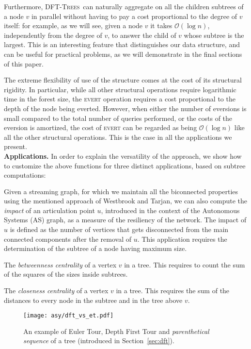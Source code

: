 \documentclass[a4paper,USenglish]{lipics}
\newcommand{\bigoh}{\mathcal{O}}
\newcommand{\dfts}{\textsc{DFT-Trees}}
\newcommand{\runinsec}[1]{\noindent\textbf{\textsf{#1}}\quad}
\begin{document}
Furthermore, \dfts\ can naturally aggregate on all the children subtrees of a node $v$ in parallel without having to pay a cost proportional to the degree of $v$ itself: for example, as we will see, given a node $v$ it takes $\bigoh(\log n)$, independently from the degree of $v$, to answer the child of $v$ whose subtree is the largest. This is an interesting feature that distinguishes our data structure, and can be useful for practical problems, as we will demonstrate in the final sections of this paper.

The extreme flexibility of use of the structure comes at the cost of its structural rigidity. In particular, while all other structural operations require logarithmic time in the forest size, the \textsc{evert} operation requires a cost proportional to the depth of the node being everted. However, when either the number of eversions is small compared to the total number of queries performed, or the costs of the eversion is amortized, the cost of \textsc{evert} can be regarded as being $\bigoh(\log n)$ like all the other structural operations. This is the case in all the applications we present.
\\[3mm]
\runinsec{Applications.}  In order to explain the versatility of the approach, we show how to customize the above functions for three distinct applications, based on subtree computations:
\begin{compactitem}
\item Given a streaming graph, for which we maintain all the biconnected properties using the mentioned approach of Westbrook and Tarjan, we can also compute the \emph{impact} of an articulation point $u$, introduced in the context of the Autonomous Systems (AS) graph, as a measure of the resiliency of the network. The impact of $u$ is defined as the number of vertices that gets disconnected from the main connected components after the removal of $u$. This application requires the determination of the subtree of a node  having maximum size.
\item The \emph{betweenness centrality} of a vertex $v$ in a tree. This requires to count the sum of the squares of the sizes inside subtrees. 
\item The \emph{closeness centrality} of a vertex $v$ in a tree. This requires the sum of the distances to every node in the subtree and in the tree above $v$. 
\end{compactitem}
\begin{figure}[t!]
\centering
\texttt{[image: asy/dft\_vs\_et.pdf]}\hfill
{}
\caption{\label{fig:dftvseuler}An example of Euler Tour, Depth First Tour and \emph{parenthetical sequence} of a tree (introduced in Section~\ref{sec:dft}).}
\end{figure}
\end{document}
